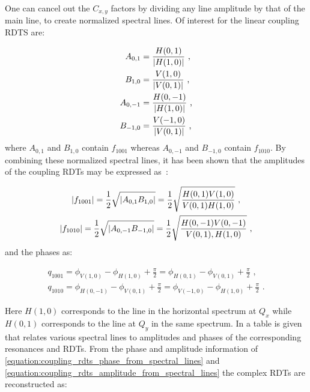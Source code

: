 One can cancel out the \(C_{x,y}\) factors by dividing any line amplitude by that of the main line, to create normalized spectral lines.
Of interest for the linear coupling RDTS are:

\begin{equation}
  \begin{aligned}
    A_{0,1} &= \frac{H(0,1)}{\left\lvert H(1,0) \right\rvert}    \text{ ,}  \\
    B_{1,0} &= \frac{V(1,0)}{\left\lvert V(0,1) \right\rvert}    \text{ ,}  \\
    A_{0,-1} &= \frac{H(0,-1)}{\left\lvert H(1,0) \right\rvert}  \text{ ,}  \\
    B_{-1,0} &= \frac{V(-1,0)}{\left\lvert V(0,1) \right\rvert}  \text{ ,}
  \end{aligned}
  \label{equation:normalized_spectral_lines}
\end{equation}
where \(A_{0,1}\) and \(B_{1,0}\) contain \(f_{1001}\) whereas \(A_{0,-1}\) and \(B_{-1,0}\) contain \(f_{1010}\).
By combining these normalized spectral lines, it has been shown that the amplitudes of the coupling RDTs may be expressed as~\cite{CERN:Franchi:Computation_Coupling_Resonance_Driving_Term_Single_BPM,PRAB:Tomas:CERN_LHC_OMC}:

\begin{equation}
  \begin{gathered}
    \left\lvert f_{1001} \right\rvert = \frac{1}{2} \sqrt{\left\lvert A_{0,1} B_{1,0} \right\rvert}   = \frac{1}{2} \sqrt{\frac{H(0,1) V(1,0)}{V(0,1) H(1,0)}}       \text{ ,}  \\
    \left\lvert f_{1010} \right\rvert = \frac{1}{2} \sqrt{\left\lvert A_{0,-1} B_{-1,0} \right\rvert} = \frac{1}{2} \sqrt{\frac{H(0,-1) V(0,-1)}{V(0,1), H(1,0)}}  \text{ ,}
  \end{gathered}
  \label{equation:coupling_rdts_amplitude_from_spectral_lines}
\end{equation}
and the phases as:

\begin{equation}
  \begin{gathered}
    q_{1001} = \phi_{V(1,0)} -\phi_{H(1,0)} +\frac{\pi}{2} = \phi_{H(0,1)} - \phi_{V(0,1)} + \frac{\pi}{2}      \text{ ,}  \\
    q_{1010} = \phi_{H(0,-1)} -\phi_{V(0,1)} +\frac{\pi}{2} = \phi_{V(-1,0)} - \phi_{H(1,0)} + \frac{\pi}{2}    \text{ .}
  \end{gathered}
  \label{equation:coupling_rdts_phase_from_spectral_lines}
\end{equation}

Here \(H(1,0)\) corresponds to the line in the horizontal spectrum at \(Q_x\) while \(H(0, 1)\) corresponds to the line at \(Q_y\) in the same spectrum.
In \cite{PRAB:Franchi:First_Simultaneous} a table is given that relates various spectral lines to amplitudes and phases of the corresponding resonances and RDTs.
From the phase and amplitude information of \cref{equation:coupling_rdts_phase_from_spectral_lines} and \cref{equation:coupling_rdts_amplitude_from_spectral_lines} the complex RDTs are reconstructed as:

